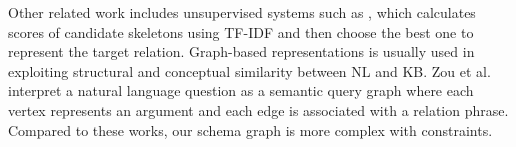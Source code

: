 Other related work includes unsupervised systems such as 
\cite{zou2014natural}, which calculates scores of candidate skeletons
using TF-IDF and then choose the best one to represent the target relation. 
Graph-based representations \cite{reddy2014large} is usually 
used in exploiting structural and conceptual similarity between NL 
and KB. Zou et al.  interpret a natural language 
question as a semantic query graph where each vertex represents an argument 
and each edge is associated with a relation phrase.  
Compared to these works, our schema graph is more complex with constraints.
